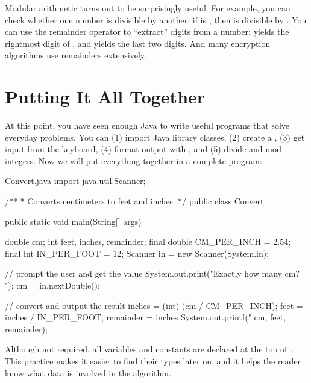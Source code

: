 
Modular arithmetic turns out to be surprisingly useful.
For example, you can check whether one number is divisible by another: if  is , then  is divisible by .
You can use the remainder operator to ``extract'' digits from a number:  yields the rightmost digit of , and  yields the last two digits.
And many encryption algorithms use remainders extensively.


\section{Putting It All Together}

At this point, you have seen enough Java to write useful programs that solve everyday problems.
You can (1) import Java library classes, (2) create a , (3) get input from the keyboard, (4) format output with , and (5) divide and mod integers.
Now we will put everything together in a complete program:



\begin{trinket}{Convert.java}
import java.util.Scanner;

/**
 * Converts centimeters to feet and inches.
 */
public class Convert {

    public static void main(String[] args) {
        double cm;
        int feet, inches, remainder;
        final double CM_PER_INCH = 2.54;
        final int IN_PER_FOOT = 12;
        Scanner in = new Scanner(System.in);

        // prompt the user and get the value
        System.out.print("Exactly how many cm? ");
        cm = in.nextDouble();

        // convert and output the result
        inches = (int) (cm / CM_PER_INCH);
        feet = inches / IN_PER_FOOT;
        remainder = inches %
        System.out.printf("%
                          cm, feet, remainder);
    }
}
\end{trinket}

Although not required, all variables and constants are declared at the top of .
This practice makes it easier to find their types later on, and it helps the reader know what data is involved in the algorithm.

